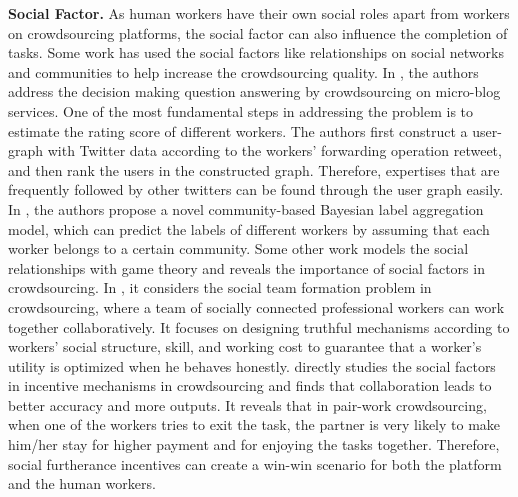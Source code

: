 \documentclass[11pt]{article}
\newcommand{\fakeparagraph}[1]{\vspace{1mm}\noindent\textbf{#1.}}
\begin{document}
\fakeparagraph{Social Factor}
As human workers have their own social roles apart from workers on crowdsourcing platforms, the social factor can also influence the completion of tasks.
Some work has used the social factors like relationships on social networks and communities \cite{add-CIKM19} to help increase the crowdsourcing quality.
In \cite{DBLP:journals/pvldb/CaoSTC12}, the authors address the decision making question answering by crowdsourcing on micro-blog services. 
One of the most fundamental steps in addressing the problem is to estimate the rating score of different workers.
The authors first construct a user-graph with Twitter data according to the workers' forwarding operation retweet, and then rank the users in the constructed graph.
Therefore, expertises that are frequently followed by other twitters can be found through the user graph easily.
In \cite{www14community}, the authors propose a novel community-based Bayesian label aggregation model, which can predict the labels of different workers by assuming that each worker belongs to a certain community.
Some other work models the social relationships with game theory and reveals the importance of social factors in crowdsourcing.
In \cite{tmc19strategic}, it considers the social team formation problem in crowdsourcing, where a team of socially connected professional workers can work together collaboratively.
It focuses on designing truthful mechanisms according to workers’ social structure, skill, and working cost to guarantee that a worker’s utility is optimized when he behaves honestly. 
\cite{TIST17} directly studies the social factors in incentive mechanisms in crowdsourcing and finds that collaboration leads to better accuracy and more outputs.
It reveals that in pair-work crowdsourcing, when one of the workers tries to exit the task, the partner is very likely to make him/her stay for higher payment and for enjoying the tasks together.
Therefore, social furtherance incentives can create a win-win scenario for both the platform and the human workers.
\end{document}
